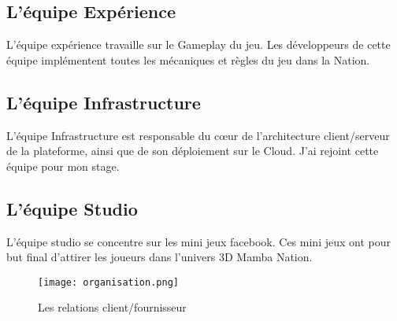 
\subsection{L'équipe Expérience}

L'équipe expérience travaille sur le Gameplay du jeu. Les développeurs de cette
équipe implémentent toutes les mécaniques et règles du jeu dans la Nation.

\subsection{L'équipe Infrastructure}
L'équipe Infrastructure est responsable du cœur de l'architecture client/serveur
de la plateforme, ainsi que de son déploiement sur le Cloud.
J'ai rejoint cette équipe pour mon stage.

\subsection{L'équipe Studio}

L'équipe studio se concentre sur les mini jeux facebook. Ces mini jeux ont pour
but final d'attirer les joueurs dans l'univers 3D Mamba Nation.


\begin{figure}[H]
  \begin{center}
    \texttt{[image: organisation.png]}   
  \end{center}
  \caption{Les relations client/fournisseur}
\end{figure}

